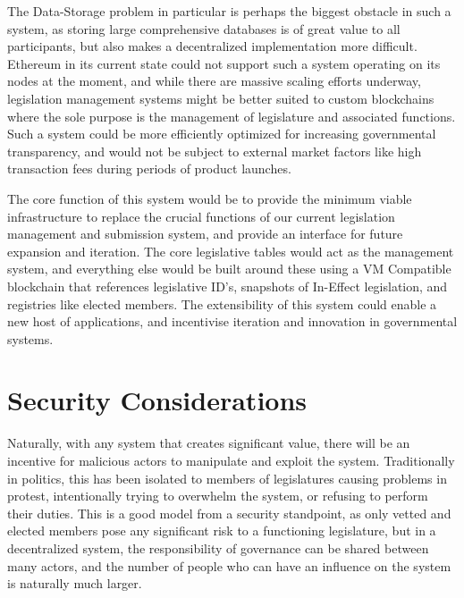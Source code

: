 \documentclass[letterpaper,twocolumn]{article}
\begin{document}
The Data-Storage problem in particular is perhaps the biggest obstacle in such a system, as storing large comprehensive databases is of great value to all participants, but also makes a decentralized implementation more difficult.  Ethereum in its current state could not support such a system operating on its nodes at the moment, and while there are massive scaling efforts underway, legislation management systems might be better suited to custom blockchains where the sole purpose is the management of legislature and associated functions.  Such a system could be more efficiently optimized for increasing governmental transparency, and would not be subject to external market factors like high transaction fees during periods of product launches.




The core function of this system would be to provide the minimum viable infrastructure to replace the crucial functions of our current legislation management and submission system, and provide an interface for future expansion and iteration.  The core legislative tables would act as the management system, and everything else would be built around these using a VM Compatible blockchain that references legislative ID's, snapshots of In-Effect legislation, and registries like elected members.  The extensibility of this system could enable a new host of applications, and incentivise iteration and innovation in governmental systems.


\section*{Security Considerations}

Naturally, with any system that creates significant value, there will be an incentive for malicious actors to manipulate and exploit the system.  Traditionally in politics, this has been isolated to members of legislatures causing problems in protest, intentionally trying to overwhelm the system, or refusing to perform their duties.  This is a good model from a security standpoint, as only vetted and elected members pose any significant risk to a functioning legislature, but in a decentralized system, the responsibility of governance can be shared between many actors, and the number of people who can have an influence on the system is naturally much larger.
\end{document}
